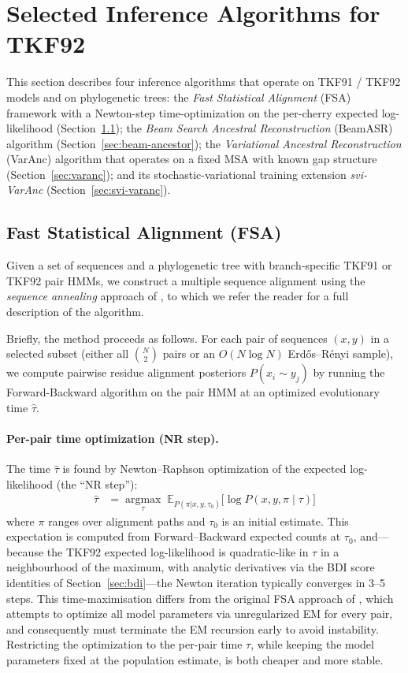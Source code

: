\section{Selected Inference Algorithms for TKF92}
\label{sec:tkf-inference}

This section describes four inference algorithms that operate on
TKF91 / TKF92 models and on phylogenetic trees:
the \emph{Fast Statistical Alignment} (FSA) framework with a
Newton-step time-optimization on the per-cherry expected
log-likelihood (Section~\ref{sec:fsa});
the \emph{Beam Search Ancestral Reconstruction} (BeamASR) algorithm
(Section~\ref{sec:beam-ancestor});
the \emph{Variational Ancestral Reconstruction} (VarAnc) algorithm
that operates on a fixed MSA with known gap structure
(Section~\ref{sec:varanc});
and its stochastic-variational training extension
\emph{svi-VarAnc} (Section~\ref{sec:svi-varanc}).

\subsection{Fast Statistical Alignment (FSA)}
\label{sec:fsa}

Given a set of sequences and a phylogenetic tree with branch-specific
TKF91 or TKF92 pair HMMs, we construct a multiple sequence alignment
using the \emph{sequence annealing} approach of \cite{BradleyEtAl2009},
to which we refer the reader for a full description of the algorithm.

Briefly, the method proceeds as follows.
For each pair of sequences $(x,y)$ in a selected subset
(either all $\binom{N}{2}$ pairs or an $O(N \log N)$ Erd\H{o}s--R\'enyi sample),
we compute pairwise residue alignment posteriors $P(x_i \sim y_j)$
by running the Forward-Backward algorithm on the pair HMM at an
optimized evolutionary time $\hat{\tau}$.

\paragraph{Per-pair time optimization (NR step).}
The time $\hat{\tau}$ is found by Newton--Raphson optimization
of the expected log-likelihood (the ``NR step''):
\begin{align}
\hat{\tau} &= \operatorname*{argmax}_\tau \;
   \mathbb{E}_{P(\pi | x,y,\tau_0)} \bigl[ \log P(x,y,\pi \mid \tau) \bigr]
\label{eq:fsa-nr}
\end{align}
where $\pi$ ranges over alignment paths and $\tau_0$ is an initial
estimate.  This expectation is computed from Forward--Backward expected
counts at $\tau_0$, and---because the TKF92 expected log-likelihood is
quadratic-like in $\tau$ in a neighbourhood of the maximum, with
analytic derivatives via the BDI score identities of
Section~\ref{sec:bdi}---the Newton iteration typically converges in
3--5 steps.
This time-maximisation differs from the original FSA approach of
\cite{BradleyEtAl2009}, which attempts to optimize all model parameters
via unregularized EM for every pair, and consequently must terminate
the EM recursion early to avoid instability.  Restricting the optimization
to the per-pair time $\tau$, while keeping the model parameters fixed
at the population estimate, is both cheaper and more stable.

